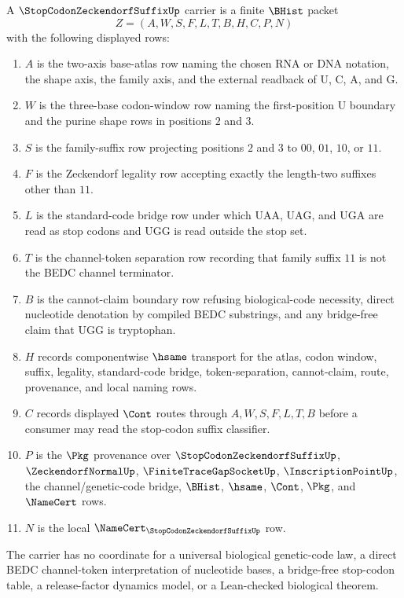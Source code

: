 \begin{definition}
\label{def:stop-codon-zeckendorf-suffix-carrier}
A $\StopCodonZeckendorfSuffixUp$ carrier is a finite $\BHist$ packet
$$
Z=(A,W,S,F,L,T,B,H,C,P,N)
$$
with the following displayed rows:
\begin{enumerate}
\item $A$ is the two-axis base-atlas row naming the chosen RNA or DNA notation, the shape axis, the family axis, and the external readback of $\mathrm{U}$, $\mathrm{C}$, $\mathrm{A}$, and $\mathrm{G}$.
\item $W$ is the three-base codon-window row naming the first-position $\mathrm{U}$ boundary and the purine shape rows in positions $2$ and $3$.
\item $S$ is the family-suffix row projecting positions $2$ and $3$ to $00$, $01$, $10$, or $11$.
\item $F$ is the Zeckendorf legality row accepting exactly the length-two suffixes other than $11$.
\item $L$ is the standard-code bridge row under which $\mathrm{UAA}$, $\mathrm{UAG}$, and $\mathrm{UGA}$ are read as stop codons and $\mathrm{UGG}$ is read outside the stop set.
\item $T$ is the channel-token separation row recording that family suffix $11$ is not the BEDC channel terminator.
\item $B$ is the cannot-claim boundary row refusing biological-code necessity, direct nucleotide denotation by compiled BEDC substrings, and any bridge-free claim that $\mathrm{UGG}$ is tryptophan.
\item $H$ records componentwise $\hsame$ transport for the atlas, codon window, suffix, legality, standard-code bridge, token-separation, cannot-claim, route, provenance, and local naming rows.
\item $C$ records displayed $\Cont$ routes through $A,W,S,F,L,T,B$ before a consumer may read the stop-codon suffix classifier.
\item $P$ is the $\Pkg$ provenance over $\StopCodonZeckendorfSuffixUp$, $\ZeckendorfNormalUp$, $\FiniteTraceGapSocketUp$, $\InscriptionPointUp$, the channel/genetic-code bridge, $\BHist$, $\hsame$, $\Cont$, $\Pkg$, and $\NameCert$ rows.
\item $N$ is the local $\NameCert_{\StopCodonZeckendorfSuffixUp}$ row.
\end{enumerate}
The carrier has no coordinate for a universal biological genetic-code law, a direct BEDC channel-token interpretation of nucleotide bases, a bridge-free stop-codon table, a release-factor dynamics model, or a Lean-checked biological theorem.
\end{definition}

